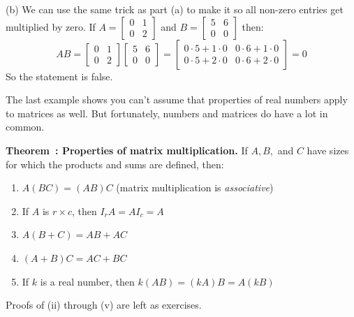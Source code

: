 \documentclass[11pt, letterpaper]{report}
\newenvironment{notes}{}{}
\newenvironment{book}{}{}
\newcounter{exercise}[section]
\newcounter{example}[section]
\newcounter{theorem}[chapter]
\newenvironment{theorem}[1][]{\refstepcounter{theorem}\begin{bbox}\par
    \noindent\textbf{Theorem~\thetheorem: #1}}{\end{bbox}}
\newlength\oldfboxsep%
\newlength\myminiwidth%
\newenvironment{bbox}{%
  \setlength\oldfboxsep\fboxsep
  \setlength{\fboxsep}{.1in}%
  \setlength\myminiwidth\linewidth%
  \addtolength\myminiwidth{-0.2in}%
  \vspace{0.1in}%
  \begin{lrbox}{\bboxbox}\begin{minipage}{\myminiwidth}%
    }{%
    \end{minipage}\end{lrbox}%
  \noindent\fbox{\usebox{\bboxbox}}\vspace{0.1in}\setlength\fboxsep\oldfboxsep%
}
\begin{document}
\begin{book}
(b) We can use the same trick as part (a) to make it so all non-zero entries get multiplied by zero. If $A = \begin{bmatrix}
0 & 1 \\
0 & 2
\end{bmatrix}$ and $B=\begin{bmatrix}
5 & 6 \\
0 & 0
\end{bmatrix}$ then:
\[AB = \begin{bmatrix}
0 & 1 \\
0 & 2
\end{bmatrix}\begin{bmatrix}
5 & 6 \\
0 & 0
\end{bmatrix} = \begin{bmatrix}
0 \cdot 5 + 1\cdot 0 & 0\cdot 6 + 1\cdot 0 \\
0 \cdot 5 + 2\cdot 0 & 0\cdot 6 + 2\cdot 0 
\end{bmatrix} = 0\]
So the statement is false. \blacksquare
\end{book}

The last example shows you can't assume that properties of real numbers apply to matrices as well. But fortunately, numbers and matrices do have a lot in common.

\begin{theorem}[Properties of matrix multiplication.] 
\label{theorem:properties-of-matrix-multiplication}
If $A,B,$ and $C$ have sizes for which the products and sums are defined, then:

\begin{enumerate}[label=(\roman*)]
\item $A(BC) = (AB)C$ \quad (matrix multiplication is \emph{associative})
\item If $A$ is $r\times c$, then $I_rA = AI_c = A$
\item $A(B+C) = AB+AC$
\item $(A+B)C = AC + BC$
\item If $k$ is a real number, then $k(AB) = (kA)B = A(kB)$
\end{enumerate}
\end{theorem}

Proofs of (ii) through (v) are left as exercises.

\begin{notes}
\vfill
\vfill
\end{notes}
\end{document}
